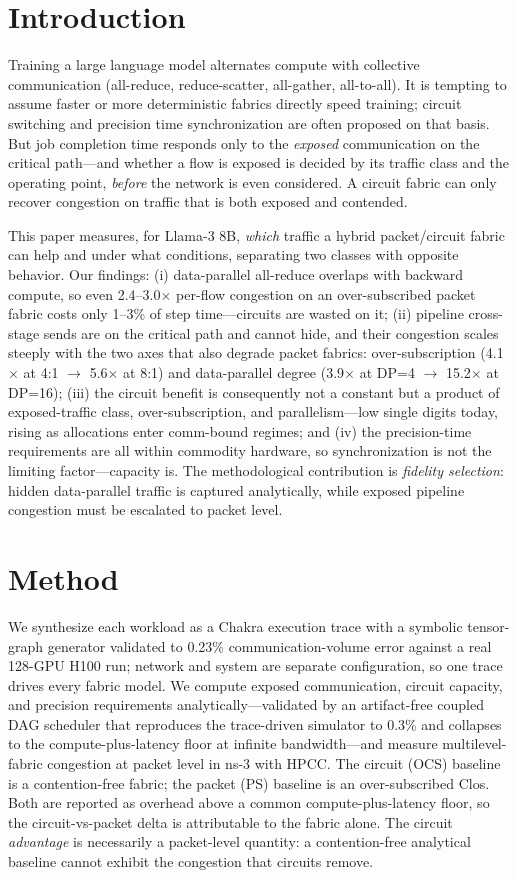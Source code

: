 \documentclass[conference]{IEEEtran}
\newcommand{\dpstep}{1--3}           %
\newcommand{\dpflow}{2.4--3.0}       %
\newcommand{\ppmult}{5.6}            %
\newcommand{\fatmult}{4.1}           %
\newcommand{\ppdpfour}{3.9}          %
\newcommand{\ppdpsixteen}{15.2}      %
\begin{document}
\section{Introduction}
Training a large language model alternates compute with collective communication
(all-reduce, reduce-scatter, all-gather, all-to-all). It is tempting to assume faster or more
deterministic fabrics directly speed training; circuit switching and precision time
synchronization are often proposed on that basis. But job completion time responds only to the
\emph{exposed} communication on the critical path---and whether a flow is exposed is decided by
its traffic class and the operating point, \emph{before} the network is even considered. A
circuit fabric can only recover congestion on traffic that is both exposed and contended.

This paper measures, for Llama-3 8B, \emph{which} traffic a hybrid packet/circuit fabric can
help and under what conditions, separating two classes with opposite behavior. Our findings:
(i) data-parallel all-reduce overlaps with backward compute, so even \dpflow$\times$ per-flow
congestion on an over-subscribed packet fabric costs only \dpstep\% of step time---circuits are
wasted on it; (ii) pipeline cross-stage sends are on the critical path and cannot hide, and
their congestion scales steeply with the two axes that also degrade packet fabrics:
over-subscription (\fatmult$\times$ at 4:1 $\to$ \ppmult$\times$ at 8:1) and data-parallel
degree (\ppdpfour$\times$ at DP=4 $\to$ \ppdpsixteen$\times$ at DP=16); (iii) the circuit
benefit is consequently not a constant but a product of exposed-traffic class, over-subscription,
and parallelism---low single digits today, rising as allocations enter comm-bound regimes; and
(iv) the precision-time requirements are all within commodity hardware, so synchronization is not
the limiting factor---capacity is. The methodological contribution is \emph{fidelity selection}:
hidden data-parallel traffic is captured analytically, while exposed pipeline congestion must be
escalated to packet level.

\section{Method}
We synthesize each workload as a Chakra execution trace with a symbolic tensor-graph generator
validated to 0.23\% communication-volume error against a real 128-GPU H100 run; network and
system are separate configuration, so one trace drives every fabric model. We compute exposed
communication, circuit capacity, and precision requirements analytically---validated by an
artifact-free coupled DAG scheduler that reproduces the trace-driven simulator to 0.3\% and
collapses to the compute-plus-latency floor at infinite bandwidth---and measure
multilevel-fabric congestion at packet level in ns-3 with HPCC. The circuit (OCS) baseline is
a contention-free fabric; the packet (PS) baseline is an over-subscribed Clos. Both are
reported as overhead above a common compute-plus-latency floor, so the circuit-vs-packet delta
is attributable to the fabric alone. The circuit \emph{advantage} is necessarily a
packet-level quantity: a contention-free analytical baseline cannot exhibit the congestion that
circuits remove.
\end{document}

